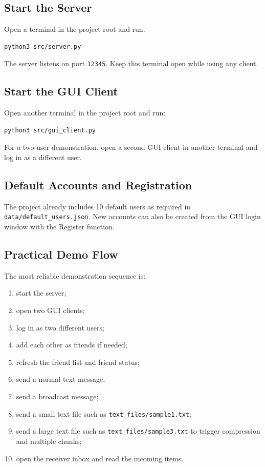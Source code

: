 \documentclass[conference]{IEEEtran}
\begin{document}
\subsection{Start the Server}
Open a terminal in the project root and run:
\begin{verbatim}
python3 src/server.py
\end{verbatim}
The server listens on port \texttt{12345}. Keep this terminal open while using any client.

\subsection{Start the GUI Client}
Open another terminal in the project root and run:
\begin{verbatim}
python3 src/gui_client.py
\end{verbatim}
For a two-user demonstration, open a second GUI client in another terminal and log in as a different user.

\subsection{Default Accounts and Registration}
The project already includes 10 default users as required in \texttt{data/default\_users.json}. New accounts can also be created from the GUI login window with the Register function. 

\subsection{Practical Demo Flow}
The most reliable demonstration sequence is:
\begin{enumerate}
\item start the server;
\item open two GUI clients;
\item log in as two different users;
\item add each other as friends if needed;
\item refresh the friend list and friend status;
\item send a normal text message;
\item send a broadcast message;
\item send a small text file such as \texttt{text\_files/sample1.txt};
\item send a large text file such as \texttt{text\_files/sample3.txt} to trigger compression and multiple chunks;
\item open the receiver inbox and read the incoming items.
\end{enumerate}
\end{document}
